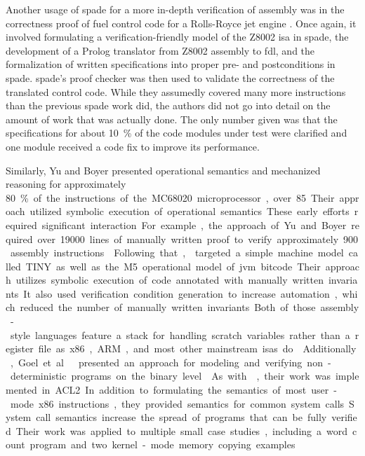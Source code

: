 Another usage of \ac{spade} for a more in-depth verification of assembly
was in the correctness proof of fuel control code for a Rolls-Royce
jet engine \autocite{oneill1988verification}. Once again,
it involved formulating a verification-friendly model of the Z8002 \ac{isa}
in \ac{spade}, the development of a Prolog translator from Z8002 assembly to \ac{fdl},
and the formalization of written specifications into proper pre- and postconditions
in \ac{spade}. \Ac{spade}'s proof checker was then used to validate the correctness
of the translated control code. While they assumedly covered many more instructions
than the previous \ac{spade} work did, the authors did not go into detail
on the amount of work that was actually done.
The only number given was that the specifications for about \SI{10}{\percent}
of the code modules under test were clarified
and one module received a code fix to improve its performance.

Similarly, Yu and Boyer \autocite{yu1993automated,boyer1996automated}
presented operational semantics and mechanized reasoning
for approximately \SI{80}\percent of the instructions of the MC68020 microprocessor,
over 85.
Their approach utilized symbolic execution of operational semantics.
These early efforts required significant interaction.
For example, the approach of Yu and Boyer required over \num{19000}
lines of manually written proof to verify approximately \num{900} assembly instructions.

Following that, \textcite{matthews2006verification}
targeted a simple machine model called TINY
as well as the M5 operational model of \ac{jvm} bitcode.
Their approach utilizes symbolic execution of code annotated
with manually written invariants.
It also used verification condition generation to increase automation,
which reduced the number of manually written invariants.
Both of those assembly-style languages feature a stack
for handling scratch variables rather than a register file
as x86, ARM, and most other mainstream \acp{isa} do.

Additionally, Goel et al.\ presented an approach for modeling and verifying
non-deterministic programs on the binary level \autocite{goel2014syscalls,goelphd}.
As with \textcite{matthews2006verification}, their work was implemented in ACL2.
In addition to formulating the semantics of most user-mode x86 instructions,
they provided semantics for common system calls.
System call semantics increase the spread of programs that can be fully verified.
Their work was applied to multiple small case studies,
including a word count program and two kernel-mode memory copying examples.
 
